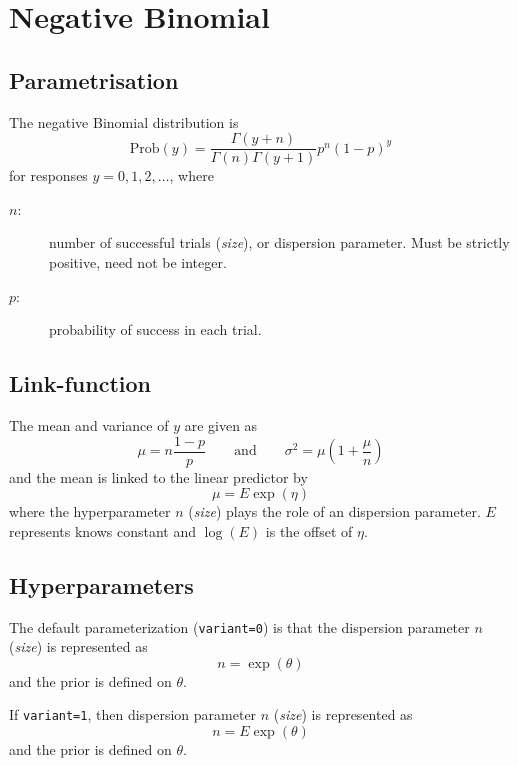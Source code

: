 \documentclass[a4paper,11pt]{article}
\begin{document}
\section*{Negative Binomial}

\subsection*{Parametrisation}

The negative Binomial distribution is
\begin{displaymath}
    \text{Prob}(y) = \frac{\Gamma(y+n)}{\Gamma(n) \Gamma(y+1)} p^n (1-p)^y
\end{displaymath}
for responses $y=0, 1, 2, \ldots$, where
\begin{description}
\item[$n$:] number of successful trials (\emph{size}), or dispersion
    parameter. Must be strictly positive, need not be integer.
\item[$p$:] probability of success in each trial.
\end{description}

\subsection*{Link-function}

The mean and variance of $y$ are given as
\begin{displaymath}
    \mu = n \frac{1-p}{p} \qquad\text{and}\qquad \sigma^{2} = \mu(1 + \frac{\mu}{n})
\end{displaymath}
and the mean is linked to the linear predictor by
\begin{displaymath}
    \mu = E \exp(\eta)
\end{displaymath}
where the hyperparameter $n$ (\emph{size}) plays the role of an
dispersion parameter. $E$ represents knows constant and $\log(E)$ is
the offset of $\eta$.

\subsection*{Hyperparameters}

The default parameterization (\verb|variant=0|) is that the dispersion
parameter $n$ (\emph{size}) is represented as
\begin{displaymath}
    n = \exp(\theta)
\end{displaymath}
and the prior is defined on $\theta$.

If \verb|variant=1|, then dispersion parameter $n$ (\emph{size}) is
represented as
\begin{displaymath}
    n = E\exp(\theta)
\end{displaymath}
and the prior is defined on $\theta$.
\end{document}
